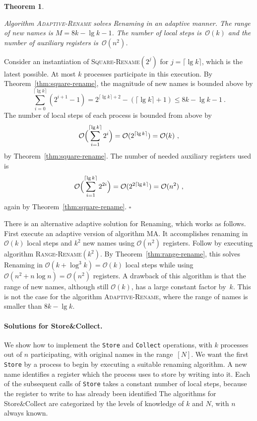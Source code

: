 \documentclass[11pt]{article}
\newcommand{\BBB}{\vspace*{-\bigskipamount}}
\newcommand{\cO}{\mathcal{O}}
\newcommand{\Paragraph}[1]{\BBB\paragraph{#1}}
\newcommand{\qed}{\hfill $\square$ \smallbreak}
\newenvironment{proof}{\noindent{\bf Proof:}}{\qed}
\newtheorem{theorem}{Theorem}
\begin{document}
\begin{theorem}
\label{thm:adaptive-rename}

Algorithm \textsc{Adaptive-Rename}  solves Renaming  in an adaptive manner. 
The range of new names is $M=8k-\lg k-1$.
The number of local steps is~$\cO(k)$ and the number of auxiliary registers is~$\cO(n^2)$.
\end{theorem}

\begin{proof}
Consider an instantiation of \textsc{Square-Rename}$(2^j)$ for $j=\lceil\lg k\rceil$, which is the latest possible. 
At most $k$ processes participate in this execution.
By Theorem~\ref{thm:square-rename}, the magnitude  of new names is bounded above by 
\[
\sum_{i=0}^{\lceil\lg k\rceil} (2^{i+1}-1) = 2^{\lceil\lg k\rceil+2}-(\lceil\lg k\rceil+1) \le 8k-\lg k -1
\ .
\]
The number of local steps of each process is bounded from above by 
\[
\cO\Bigl(\sum_{i=1}^{\lceil\lg k\rceil} 2^i\Bigr) =\cO(2^{\lceil\lg k\rceil}) =\cO(k)
\ , 
\]
by Theorem~\ref{thm:square-rename}.
The number of needed auxiliary registers used is  
\[
\cO\Bigl(\sum_{i=1}^{\lceil\lg k\rceil} 2^{2i}\Bigr) = \cO(2^{2 \lceil\lg k\rceil}) = \cO(n^2)
\ , 
\]
again by Theorem~\ref{thm:square-rename}. 
\end{proof}


There is an alternative adaptive solution for Renaming, which works as follows.
First execute an adaptive version of  algorithm \textsc{MA}.
It accomplishes renaming in $\cO(k)$ local steps and $k^2$ new names using $\cO(n^2)$ registers.
Follow by executing algorithm \textsc{Range-Rename}$(k^2)$.
By Theorem~\ref{thm:range-rename}, this solves Renaming  in $\cO(k+\log^3 k)=\cO(k)$ local steps while using $\cO(n^2+n\log n)=\cO(n^2)$ registers.
A drawback of this algorithm is that the range of new names, although still $\cO(k)$, has a large constant factor by~$k$.
This is not the case for the algorithm \textsc{Adaptive-Rename}, where the range of names is smaller than $8k-\lg k$.





\Paragraph{Solutions for Store\&Collect.}



We show how to implement the \texttt{Store} and \texttt{Collect} operations, with $k$ processes out of $n$ participating, with original names in the range~$[N]$.
We want the first \texttt{Store} by a process to begin by executing a suitable renaming algorithm.
A new name identifies a register which the process uses to store by writing into it.
Each of the subsequent calls of \texttt{Store} takes a constant number of local steps, because the register to write to has already been identified 
The algorithms for Store\&Collect are categorized by the levels of knowledge of $k$ and $N$, with $n$ always known.
\end{document}
